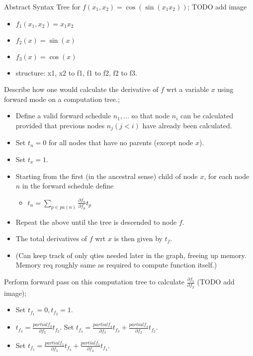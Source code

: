 \documentclass{article}
\begin{document}
Abstract Syntax Tree for $f(x_1, x_2)=\cos(\sin(x_1x_2))$; TODO add image \begin{itemize}
	\item $f_1(x_1,x_2)=x_1x_2$
	\item $f_2(x)=\sin(x)$
	\item $f_3(x) = \cos(x)$
	\item structure: x1, x2 to f1, f1 to f2, f2 to f3.
\end{itemize}

Describe how one would calculate the derivative of $f$ wrt a variable $x$ using forward mode on a computation tree.; \begin{itemize}
	\item Define a valid forward schedule $n_1,...$ so that node $n_i$ can be calculated provided that previous nodes $n_j (j<i)$ have already been calculated.
	\item Set $t_n=0$ for all nodes that have no parents (except node $x$).
	\item Set $t_x = 1$.
	\item Starting from the first (in the ancestral sense) child of node $x$, for each node $n$ in the forward schedule define \begin{itemize}
		\item $t_n = \sum_{p\in pa(n)}\frac{\partial f_n}{\partial f_p}t_p$
	\end{itemize}
\item Repeat the above until the tree is descended to node $f$.
\item The total derivatives of $f$ wrt $x$ is then given by $t_f$.
\item (Can keep track of only qties needed later in the graph, freeing up memory. Memory req roughly same as required to compute function itself.)
\end{itemize}

Perform forward pass on this computation tree to calculate $\frac{\partial f_5}{\partial f_2}$ (TODO add image); \begin{itemize}
	\item Set $t_{f_1}=0, t_{f_2}=1$.
	\item $t_{f_3} = \frac{partial f_3}{\partial f_2}t_{f_2}$. Set $t_{f_4} = \frac{partial f_4}{\partial f_3}t_{f_3} + \frac{partial f_4}{\partial f_2}t_{f_2}$.
	\item Set $t_{f_5} = \frac{partial f_5}{\partial f_3}t_{f_3} + \frac{partial f_5}{\partial f_4}t_{f_4}$.
\end{itemize}
\end{document}
